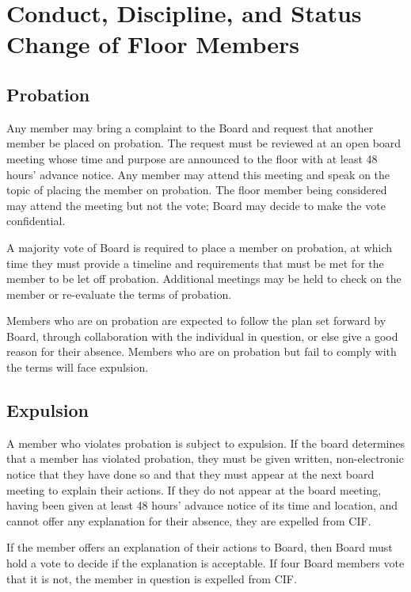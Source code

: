 \section{Conduct, Discipline, and Status Change of Floor Members}
\label{sec:conduct-and-discipline}



	\subsection{Probation}

Any member may bring a complaint to the Board and request that another member be placed on probation. The request must be reviewed at an open board meeting whose time and purpose are announced to the floor with at least 48 hours' advance notice. Any member may attend this meeting and speak on the topic of placing the member on probation. The floor member being considered may attend the meeting but not the vote; Board may decide to make the vote confidential.

A majority vote of Board is required to place a member on probation, at which time they must provide a timeline and requirements that must be met for the member to be let off probation. Additional meetings may be held to check on the member or re-evaluate the terms of probation.

Members who are on probation are expected to follow the plan set forward by Board, through collaboration with the individual in question, or else give a good reason for their absence. Members who are on probation but fail to comply with the terms will face expulsion.



	\subsection{Expulsion}

A member who violates probation is subject to expulsion. If the board determines that a member has violated probation, they must be given written, non-electronic notice that they have done so and that they must appear at the next board meeting to explain their actions. If they do not appear at the board meeting, having been given at least 48 hours' advance notice of its time and location, and cannot offer any explanation for their absence, they are expelled from CIF\@.

If the member offers an explanation of their actions to Board, then Board must hold a vote to decide if the explanation is acceptable. If four Board members vote that it is not, the member in question is expelled from CIF\@.

